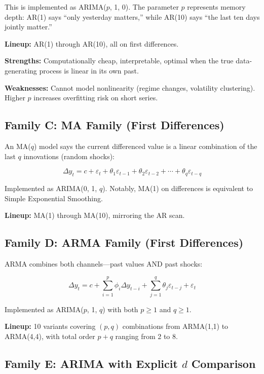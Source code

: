 This is implemented as ARIMA($p$, 1, 0). The parameter $p$ represents memory depth: AR(1) says ``only yesterday matters,'' while AR(10) says ``the last ten days jointly matter.''

\textbf{Lineup:} AR(1) through AR(10), all on first differences.

\textbf{Strengths:} Computationally cheap, interpretable, optimal when the true data-generating process is linear in its own past.

\textbf{Weaknesses:} Cannot model nonlinearity (regime changes, volatility clustering). Higher $p$ increases overfitting risk on short series.

\subsection{Family C: MA Family (First Differences)}

An MA($q$) model says the current differenced value is a linear combination of the last $q$ innovations (random shocks):

\begin{equation}
\Delta y_t = c + \varepsilon_t + \theta_1 \varepsilon_{t-1} + \theta_2 \varepsilon_{t-2} + \cdots + \theta_q \varepsilon_{t-q}
\end{equation}

Implemented as ARIMA(0, 1, $q$). Notably, MA(1) on differences is equivalent to Simple Exponential Smoothing.

\textbf{Lineup:} MA(1) through MA(10), mirroring the AR scan.

\subsection{Family D: ARMA Family (First Differences)}

ARMA combines both channels---past values AND past shocks:

\begin{equation}
\Delta y_t = c + \sum_{i=1}^{p} \phi_i \Delta y_{t-i} + \sum_{j=1}^{q} \theta_j \varepsilon_{t-j} + \varepsilon_t
\end{equation}

Implemented as ARIMA($p$, 1, $q$) with both $p \geq 1$ and $q \geq 1$.

\textbf{Lineup:} 10 variants covering $(p,q)$ combinations from ARMA(1,1) to ARMA(4,4), with total order $p+q$ ranging from 2 to 8.

\subsection{Family E: ARIMA with Explicit $d$ Comparison}

